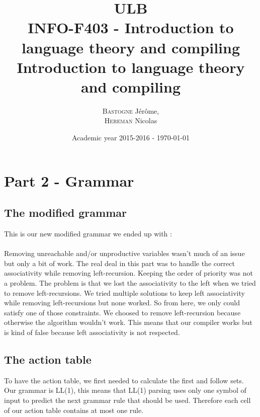 \documentclass[a4paper,10pt]{report}
\title{ULB\\
        INFO-F403 - Introduction to language theory and compiling \\
            Introduction to language theory and compiling}
\author{\textsc{Bastogne} Jérôme,\\
        \textsc{Hereman} Nicolas}
\date{Academic year 2015-2016 - \today}
\begin{document}
\maketitle
\clearpage


\chapter{Part 2 - Grammar}

\section{The modified grammar}

This is our new modified grammar we ended up with : \\




\hfill \\
Removing unreachable and/or unproductive variables wasn't much of an issue but only a bit of work. The real deal in this part was to handle the correct associativity while removing left-recursion. Keeping the order of priority was not a problem. The problem is that we lost the associativity to the left when we tried to remove left-recursions. We tried multiple solutions to keep left associativity while removing left-recursions but none worked. So from here, we only could satisfy one of those constraints. We choosed to remove left-recursion because otherwise the algorithm wouldn't work. This means that our compiler works but is kind of false because left associativity is not respected.

\section{The action table}

To have the action table, we first needed to calculate the first and follow sets. Our grammar is LL(1), this means that LL(1) parsing uses only one symbol of input to predict the next grammar rule that should be used. Therefore each cell of our action table contains at most one rule.





\end{document}
